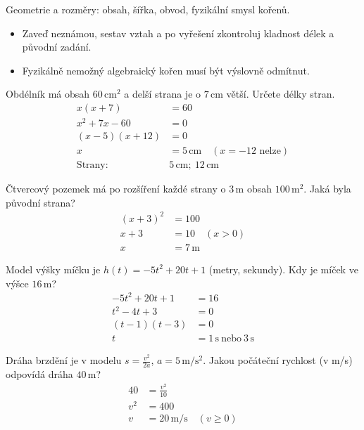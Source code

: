 \documentclass[11pt,a4paper]{article}
\begin{document}
Geometrie a rozměry: obsah, šířka, obvod, fyzikální smysl kořenů.
\begin{itemize}
\item Zaveď neznámou, sestav vztah a po vyřešení zkontroluj kladnost délek a původní zadání.
\item Fyzikálně nemožný algebraický kořen musí být výslovně odmítnut.
\end{itemize}
\begin{prikladReseniBox}[title={Příklad 1}]
Obdélník má obsah $60\,\mathrm{cm^2}$ a delší strana je o $7\,\mathrm{cm}$ větší. Určete délky stran.
\tcblower
\[
\begin{aligned}
x(x+7)&=60\\[2pt]
x^2+7x-60&=0\\[2pt]
(x-5)(x+12)&=0\\[2pt]
x&=5\,\mathrm{cm}\quad (x=-12\text{ nelze})\\[2pt]
\text{Strany: }&5\,\mathrm{cm};\ 12\,\mathrm{cm}
\end{aligned}
\]
\end{prikladReseniBox}
\begin{prikladReseniBox}[title={Příklad 2}]
Čtvercový pozemek má po rozšíření každé strany o $3\,\mathrm m$ obsah $100\,\mathrm{m^2}$. Jaká byla původní strana?
\tcblower
\[
\begin{aligned}
(x+3)^2&=100\\[2pt]
x+3&=10\quad (x>0)\\[2pt]
x&=7\,\mathrm m
\end{aligned}
\]
\end{prikladReseniBox}
\begin{prikladReseniBox}[title={Příklad 3}]
Model výšky míčku je $h(t)=-5t^2+20t+1$ (metry, sekundy). Kdy je míček ve výšce $16\,\mathrm m$?
\tcblower
\[
\begin{aligned}
-5t^2+20t+1&=16\\[2pt]
t^2-4t+3&=0\\[2pt]
(t-1)(t-3)&=0\\[2pt]
t&=1\,\mathrm s\ \text{nebo}\ 3\,\mathrm s
\end{aligned}
\]
\end{prikladReseniBox}
\begin{zadaniReseniBox}[title={Samostatná práce 1}]
Dráha brzdění je v modelu $s=\frac{v^2}{2a}$, $a=5\,\mathrm{m/s^2}$. Jakou počáteční rychlost (v m/s) odpovídá dráha $40\,\mathrm m$?
\tcblower
\[
\begin{aligned}
40&=\frac{v^2}{10}\\[2pt]
v^2&=400\\[2pt]
v&=20\,\mathrm{m/s}\quad(v\ge0)
\end{aligned}
\]
\end{zadaniReseniBox}
\end{document}
